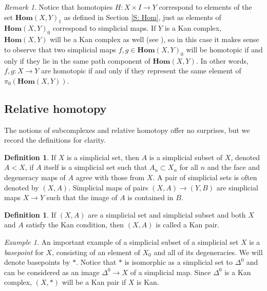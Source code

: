 \documentclass[12pt]{article}
\theoremstyle{plain}
\theoremstyle{definition}
\newtheorem{definition}[theorem]{Definition}
\theoremstyle{remark}
\newtheorem{remark}[theorem]{Remark}
\newtheorem{example}[theorem]{Example}
\newcommand{\Homs}{\textbf{Hom}}
\begin{document}
\begin{remark}
Notice that homotopies $H\colon X\times I\to Y$ correspond to elements of the set $\Homs(X,Y)_1$ as defined in Section \ref{S: Hom}, just as elements of $\Homs(X,Y)_0$ correspond to simplicial maps. If $Y$ is a Kan complex, $\Homs(X,Y)$ will be a Kan complex as well (see \cite[Theorem 1.6.9]{MAY67}), so 
in this case it makes sense to observe that two simplicial maps $f,g\in \Homs(X,Y)_0$ will be  homotopic if and only if they lie in the same path component of $\Homs(X,Y)$. In other words, $f,g:X\to Y$ are homotopic if and only if they represent the same element of $\pi_0(\Homs(X,Y))$.
\end{remark}





\subsection{Relative homotopy}\label{S: relative homotopy}

The notions of subcomplexes and relative homotopy offer no surprises, but we record the definitions for clarity.

\begin{definition}
If $X$ is a simplicial set, then $A$ is a simplicial subset of $X$, denoted $A<X$, if $A$ itself is a simplicial set such that $A_n\subset X_n$ for all $n$ and the face and degeneracy maps of $A$ agree with those from $X$. A pair of simplicial sets is often denoted by $(X,A)$. 
Simplicial maps of pairs $(X,A)\to (Y,B)$ are simplicial maps $X\to Y$  such that the image of $A$ is contained in $B$.
\end{definition}

\begin{definition}
If $(X,A)$ are a simplicial set and simplicial subset and both $X$ and $A$ satisfy the Kan condition, then $(X,A)$ is called a Kan pair.
\end{definition}

\begin{example}
An important example of a simplicial subset of a simplicial set $X$ is a \emph{basepoint} for $X$, consisting of an element of $X_0$ and all of its degeneracies. We will denote basepoints by $*$. Notice that $*$ is isomorphic as a simplicial set to $\Delta^0$ and can be considered as an image $\Delta^0\to X$ of a simplicial map. Since $\Delta^0$ is a Kan complex, $(X,*)$ will be a Kan pair if $X$ is Kan. 
\end{example}
\end{document}
